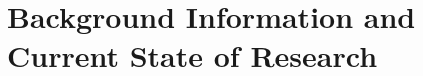 \documentclass[11pt]{article}
\begin{document}




\section{Background Information and Current State of Research}
\end{document}
